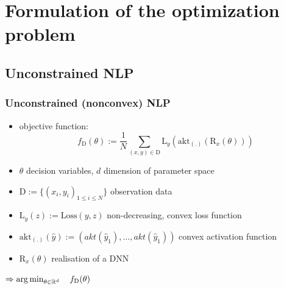 


\beamertemplatenavigationsymbolsempty{}




\section{Formulation of the optimization problem}

   \subsection{Unconstrained NLP}
   
   \begin{frame}
   \frametitle{Unconstrained (nonconvex) NLP}
   \begin{itemize}
   
   	\item[] objective function:
   	$$f_{\mathrm{D}}(\theta) := \frac{1}{N}\sum_{(x, y)\in\mathrm{D}}^{}\mathrm{L}_{y}(\text{akt}_{(.)}(\mathrm{R}_{x}(\theta)))$$
   	\pause
   	
   	\item $\theta$ decision variables, $d$ dimension of parameter space
   	
   	\item $\mathrm{D} := \{(x_{i}, y_{i})_{1\leq i\leq N}\}$ observation data
   	
   	\item $\mathrm{L}_{y}(z) := \text{Loss}(y, z)$ non-decreasing, convex loss function 
   	
   	\item $\text{akt}_{(.)}(\hat{y}) := \left(akt(\hat{y}_{1}), \ldots, akt(\hat{y}_{1})\right)$ convex activation function %
   	
   	\item $\mathrm{R}_{x}(\theta)$ realisation of a DNN
     	
  \end{itemize}

	\begin{center}
	$\Rightarrow \operatorname*{arg\,min}_{\theta\in\mathbb{R}^{d}}\quad f_{\mathrm{D}}(\theta)$
	\end{center}
	
  \end{frame}
